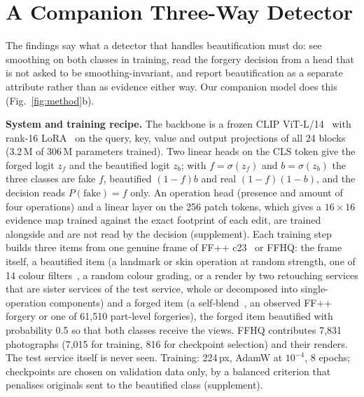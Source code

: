 \documentclass[conference]{IEEEtran}
\begin{document}
\section{A Companion Three-Way Detector}
\label{sec:companion}
The findings say what a detector that handles beautification must do: see smoothing on both classes in training, read the
forgery decision from a head that is not asked to be smoothing-invariant, and report beautification as a separate attribute
rather than as evidence either way. Our companion model does this (Fig.~\ref{fig:method}b).

\textbf{System and training recipe.} The backbone is a frozen CLIP ViT-L/14~\cite{clip} with rank-16 LoRA~\cite{lora} on the
query, key, value and output projections of all 24 blocks (3.2\,M of 306\,M parameters trained). Two linear heads on the CLS
token give the forged logit $z_f$ and the beautified logit $z_b$; with $f=\sigma(z_f)$ and $b=\sigma(z_b)$ the three classes
are fake $f$, beautified $(1-f)b$ and real $(1-f)(1-b)$, and the decision reads $P(\text{fake})=f$ only. An operation head
(presence and amount of four operations) and a linear layer on the 256 patch tokens, which gives a $16\times16$ evidence map
trained against the exact footprint of each edit, are trained alongside and are not read by the decision (supplement).
Each training step builds three items from one genuine frame of FF++ c23~\cite{ffpp} or FFHQ: the frame itself, a beautified
item (a landmark or skin operation at random strength, one of 14 colour filters~\cite{pilgram}, a random colour grading, or a
render by two retouching services that are sister services of the test service, whole or decomposed into single-operation
components) and a forged item (a self-blend~\cite{sbi}, an observed FF++ forgery or one of 61,510 part-level forgeries), the
forged item beautified with probability 0.5 so that both classes receive the views. FFHQ contributes 7,831 photographs
(7,015 for training, 816 for checkpoint selection) and their renders.
The test service itself is never seen. Training: 224\,px, AdamW at $10^{-4}$, 8 epochs; checkpoints are chosen on validation
data only, by a balanced criterion that penalises originals sent to the beautified class (supplement).
\end{document}
